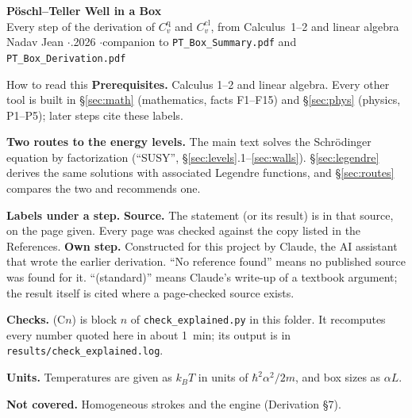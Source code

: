 \documentclass[11pt]{article}
\numberwithin{equation}{section}
\newcommand{\Cq}{C_v^{\mathrm{q}}}
\newcommand{\Ccl}{C_v^{\mathrm{cl}}}
\newcommand{\kB}{k_B}
\newcommand{\Eu}{\hbar^2\alpha^2/2m}
\begin{document}
\begin{center}
{\LARGE\bfseries P\"oschl--Teller Well in a Box}\\[2mm]
{\large Every step of the derivation of $\Cq$ and $\Ccl$, from Calculus~1--2 and linear algebra}\\[2mm]
{\small Nadav Jean \quad$\cdot$.2026 \quad$\cdot$\quad companion to \texttt{PT\_Box\_Summary.pdf} and \texttt{PT\_Box\_Derivation.pdf}}
\end{center}
\thispagestyle{fancy}

\begin{guide}{How to read this}
\textbf{Prerequisites.} Calculus 1--2 and linear algebra. Every other tool is built in \S\ref{sec:math} (mathematics, facts F1--F15) and \S\ref{sec:phys} (physics, P1--P5); later steps cite these labels.

\textbf{Two routes to the energy levels.} The main text solves the Schr\"odinger equation by factorization (``SUSY'', \S\ref{sec:levels}.1--\ref{sec:walls}). \S\ref{sec:legendre} derives the same solutions with associated Legendre functions, and \S\ref{sec:routes} compares the two and recommends one.

\textbf{Labels under a step.}
\textcolor{srccol}{\textsf{\textbf{Source.}}} The statement (or its result) is in that source, on the page given. Every page was checked against the copy listed in the References.
\textcolor{owncol}{\textsf{\textbf{Own step.}}} Constructed for this project by Claude, the AI assistant that wrote the earlier derivation. ``No reference found'' means no published source was found for it. ``(standard)'' means Claude's write-up of a textbook argument; the result itself is cited where a page-checked source exists.

\textbf{Checks.} (C$n$) is block $n$ of \texttt{check\_explained.py} in this folder. It recomputes every number quoted here in about 1~min; its output is in \texttt{results/check\_explained.log}.

\textbf{Units.} Temperatures are given as $\kB T$ in units of $\Eu$, and box sizes as $\alpha L$.

\textbf{Not covered.} Homogeneous strokes and the engine (Derivation \S7).
\end{guide}
\end{document}
